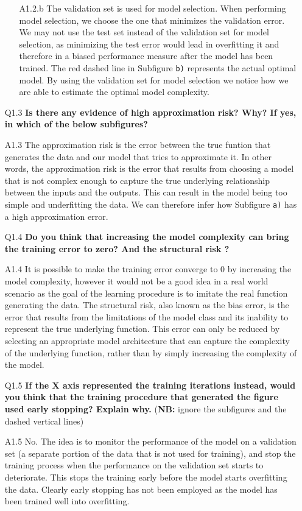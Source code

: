 \documentclass[tikz,14pt,fleqn]{article}
\begin{document}
\begin{itemize}
\begin{itemize}
\item[A1.2.b] The validation set is used for model selection. When performing model selection, we choose the one that minimizes the validation error. We may not use the test set instead of the validation set for model selection, as minimizing the test error would lead in overfitting it and therefore in a biased performance measure after the model has been trained.
The red dashed line in Subfigure \verb|b)| represents the actual optimal model. By using the validation set for model selection we notice how we are able to estimate the optimal model complexity.
\end{itemize}
\item[Q1.3] \textbf{Is there any evidence of high approximation risk? Why? If yes, in which of the below subfigures?} 
\item[A1.3] The approximation risk is the error between the true funtion that generates the data and our model that tries to approximate it. In other words, the approximation risk is the error that results from choosing a model that is not complex enough to capture the true underlying relationship between the inputs and the outputs. This can result in the model being too simple and underfitting the data. We can therefore infer how Subfigure \verb|a)| has a high approximation error.
\item[Q1.4] \textbf{Do you think that increasing the model complexity can bring the training error to zero? And the structural risk ?}
\item[A1.4] It is possible to make the training error converge to 0 by increasing the model complexity, however it would not be a good idea in a real world scenario as the goal of the learning procedure is to imitate the real function generating the data. The structural risk, also known as the bias error, is the error that results from the limitations of the model class and its inability to represent the true underlying function. This error can only be reduced by selecting an appropriate model architecture that can capture the complexity of the underlying function, rather than by simply increasing the complexity of the model.
\item[Q1.5] \textbf{If the X axis represented the training iterations instead, would you think that the training procedure that generated the figure used early stopping? Explain why.} (\textbf{NB:} ignore the subfigures and the dashed vertical lines)
\item[A1.5]  No. The idea is to monitor the performance of the model on a validation set (a separate portion of the data that is not used for training), and stop the training process when the performance on the validation set starts to deteriorate. This stops the training early before the model starts overfitting the data. Clearly early stopping has not been employed as the model has been trained well into overfitting.
\end{itemize}
\end{document}
